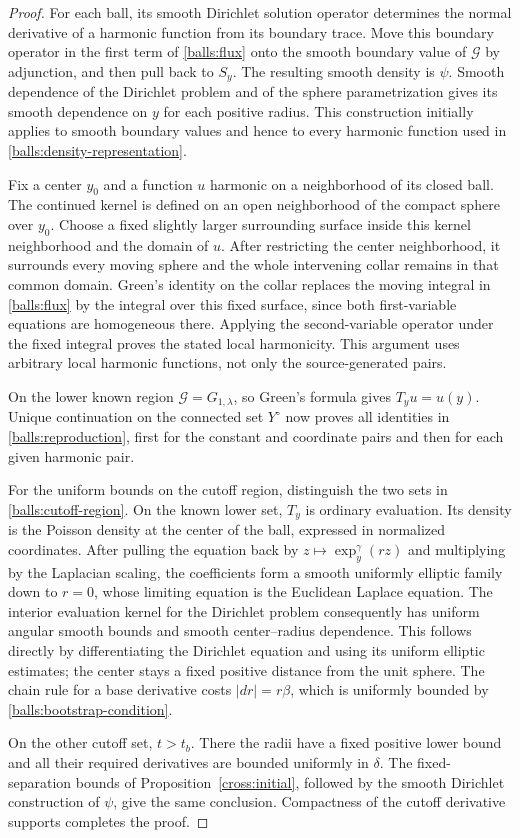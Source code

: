 \documentclass[11pt]{article}
\theoremstyle{definition}
\theoremstyle{remark}
\numberwithin{equation}{section}
\begin{document}
\begin{proof}
For each ball, its smooth Dirichlet solution operator determines the
normal derivative of a harmonic function from its boundary trace.
Move this boundary operator in the first term of \eqref{balls:flux}
onto the smooth boundary value of $\mathcal G$ by adjunction, and then
pull back to $S_y$.  The resulting smooth density is $\psi$.
Smooth dependence of the Dirichlet problem and of the sphere
parametrization gives its smooth dependence on $y$ for each positive
radius.  This construction initially applies to smooth boundary
values and hence to every harmonic function used in
\eqref{balls:density-representation}.

Fix a center $y_0$ and a function $u$ harmonic on a neighborhood of its
closed ball.  The continued kernel is defined on an open neighborhood
of the compact sphere over $y_0$.  Choose a fixed slightly larger
surrounding surface inside this kernel neighborhood and the domain
of $u$.  After restricting the center neighborhood, it surrounds every
moving sphere and the whole intervening collar remains in that common
domain.  Green's identity on the collar replaces the moving integral
in \eqref{balls:flux} by the integral over this fixed surface, since
both first-variable equations are homogeneous there.  Applying the
second-variable operator under the fixed integral proves the stated
local harmonicity.  This argument uses arbitrary local harmonic
functions, not only the source-generated pairs.

On the lower known region $\mathcal G=G_{1,\lambda}$, so Green's formula
gives $T_yu=u(y)$.  Unique continuation on the connected set $Y^\circ$
now proves all identities in \eqref{balls:reproduction}, first for the
constant and coordinate pairs and then for each given harmonic pair.

For the uniform bounds on the cutoff region, distinguish the two sets
in \eqref{balls:cutoff-region}.  On the known lower set, $T_y$ is ordinary
evaluation.  Its density is the Poisson density at the center of the
ball, expressed in normalized coordinates.  After pulling the equation
back by $z\mapsto\exp_y^\gamma(rz)$ and multiplying by the Laplacian
scaling, the coefficients form a smooth uniformly elliptic family down
to $r=0$, whose limiting equation is the Euclidean Laplace equation.
The interior evaluation kernel for the Dirichlet problem consequently
has uniform angular smooth bounds and smooth center--radius dependence.
This follows directly by differentiating the Dirichlet equation and
using its uniform elliptic estimates; the center stays a fixed positive
distance from the unit sphere.  The chain rule for a base derivative
costs $|dr|=r\beta$, which is uniformly bounded by
\eqref{balls:bootstrap-condition}.

On the other cutoff set, $t>t_b$.  There the radii have a fixed positive
lower bound and all their required derivatives are bounded uniformly in
$\delta$.  The fixed-separation bounds of
Proposition~\ref{cross:initial}, followed by the smooth Dirichlet
construction of $\psi$, give the same conclusion.  Compactness of the
cutoff derivative supports completes the proof.
\end{proof}
\end{document}
